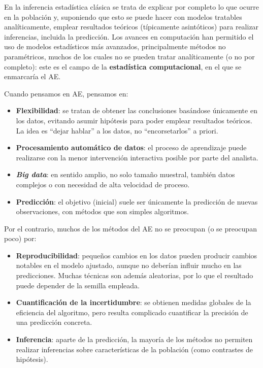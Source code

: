 \documentclass[
]{book}
\theoremstyle{break}
\theoremstyle{nonumberplain}
\begin{document}
En la inferencia estadística clásica se trata de explicar por completo lo que ocurre en la población y, suponiendo que esto se puede hacer con modelos tratables analíticamente, emplear resultados teóricos (típicamente asintóticos) para realizar inferencias, incluida la predicción. Los avances en computación han permitido el uso de modelos estadísticos más avanzados, principalmente métodos no paramétricos, muchos de los cuales no se pueden tratar analíticamente (o no por completo): este es el campo de la \textbf{estadística computacional}, en el que se enmarcaría el AE.

Cuando pensamos en AE, pensamos en:

\begin{itemize}
\item
  \textbf{Flexibilidad}: se tratan de obtener las conclusiones basándose únicamente en los datos, evitando asumir hipótesis para poder emplear resultados teóricos. La idea es ``dejar hablar'' a los datos, no ``encorsetarlos'' a priori.
\item
  \textbf{Procesamiento automático de datos}: el proceso de aprendizaje puede realizarse con la menor intervención interactiva posible por parte del analista.
\item
  \textbf{\emph{Big data}}: en sentido amplio, no solo tamaño muestral, también datos complejos o con necesidad de alta velocidad de proceso.
\item
  \textbf{Predicción}: el objetivo (inicial) suele ser únicamente la predicción de nuevas observaciones, con métodos que son simples algoritmos.
\end{itemize}

Por el contrario, muchos de los métodos del AE no se preocupan (o se preocupan poco) por:

\begin{itemize}
\item
  \textbf{Reproducibilidad}: pequeños cambios en los datos pueden producir cambios notables en el modelo ajustado, aunque no deberían influir mucho en las predicciones. Muchas técnicas son además aleatorias, por lo que el resultado puede depender de la semilla empleada.
\item
  \textbf{Cuantificación de la incertidumbre}: se obtienen medidas globales de la eficiencia del algoritmo, pero resulta complicado cuantificar la precisión de una predicción concreta.
\item
  \textbf{Inferencia}: aparte de la predicción, la mayoría de los métodos no permiten realizar inferencias sobre características de la población (como contrastes de hipótesis).
\end{itemize}
\end{document}
